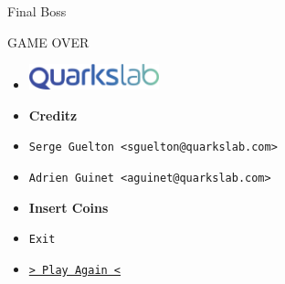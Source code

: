 \documentclass[14pt]{beamer}
\begin{document}
\begin{frame}{Final Boss}
{
        }

    \end{frame}



    \begin{frame}{GAME OVER}

        \begin{itemize}
            \centering
            \item[]\includegraphics[height=2em]{logo.png}
            \item[]\alert{\bf Creditz}\vspace{-1em}
            \item[]\texttt{Serge~Guelton~<sguelton@quarkslab.com>}
            \item[]\texttt{Adrien Guinet <aguinet@quarkslab.com>}
        \end{itemize}
        \begin{itemize}
            \centering
            \item[]\alert{\bf Insert Coins}\vspace{.1em}
            \item[]\texttt{Exit}
            \item[]\texttt{\hyperlink{page.1}{> Play Again <}}
        \end{itemize}

    \end{frame}
\end{document}

